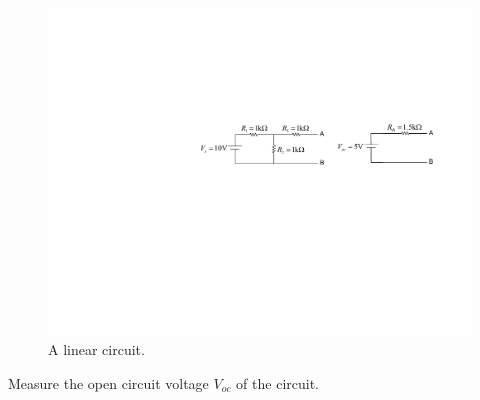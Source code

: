 \documentclass[11pt]{article}
\begin{document}
\begin{question}


    \begin{figure}[H]
        \centering
        \includegraphics[scale=1.2,angle=0]{Fig/cir2.pdf}
        \caption{A linear circuit.} \label{fig:cir2}
    \end{figure}


    \begin{subquestion}{Measure the open circuit voltage $V_{oc}$ of the circuit.}
    \end{subquestion}


\end{question}
\end{document}

